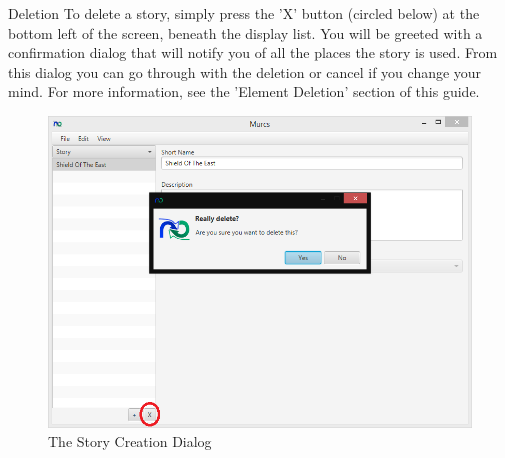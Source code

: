 Deletion\newline
To delete a story, simply press the 'X' button (circled below) at the bottom left of the screen, beneath the display list. You will be greeted with a confirmation dialog that will notify you of all the places the story is used. From this dialog you can go through with the deletion or cancel if you change your mind. For more information, see the 'Element Deletion' section of this guide.

\begin{figure}[H]
\centering
\includegraphics[width=\textwidth]{images/screenshots/stories5.PNG}
\caption{The Story Creation Dialog}
\label{fig:new_project}
\end{figure}
